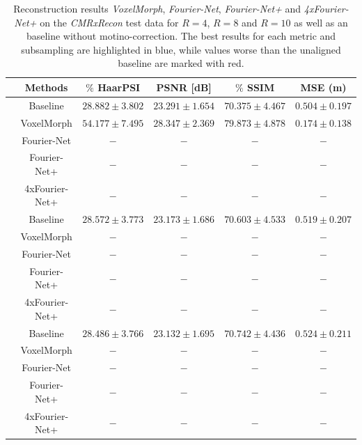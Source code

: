 \begin{table}[h] %
	\footnotesize
	\centering
	\caption{Reconstruction results \emph{VoxelMorph}, \emph{Fourier-Net}, \emph{Fourier-Net+} and \emph{4xFourier-Net+} on the \emph{CMRxRecon} test data for $R=4$, $R=8$ and $R=10$ as well as an baseline without motino-correction. The best results for each metric and subsampling are highlighted in blue, while values worse than the unaligned baseline are marked with red.}
	\label{tab:ComparisonReconstructionCMRxRecon}
	\begin{tabular}{c c c c c c} 
		\toprule
		 & Methods & $\%$ HaarPSI & PSNR [dB] & $\%$ SSIM & MSE (m)\\
		
		\midrule
		\multirow{5}{*}{\rotatebox{90}{$R=4$}} & Baseline & $28.882 \pm 3.802$ & $23.291 \pm 1.654$ & $70.375 \pm 4.467$ & $0.504 \pm 0.197$ \\  
		 & VoxelMorph & $54.177 \pm 7.495$ & $28.347 \pm 2.369$ & $79.873 \pm 4.878$ & $0.174 \pm 0.138$ \\ 
		 & Fourier-Net & $-$ & $-$ & $-$ & $-$ \\  
		 & Fourier-Net+ & $-$ & $-$ & $-$ & $-$ \\    
		 & 4xFourier-Net+ & $-$ & $-$ & $-$ & $-$ \\ 
		
		\midrule
		\multirow{5}{*}{\rotatebox{90}{$R=8$}} & Baseline & $28.572 \pm 3.773$ & $23.173 \pm 1.686$ & $70.603 \pm 4.533$ & $0.519 \pm 0.207$ \\  
		 & VoxelMorph & $-$ & $-$ & $-$ & $-$ \\ 
		 & Fourier-Net & $-$ & $-$ & $-$ & $-$ \\  
		 & Fourier-Net+ & $-$ & $-$ & $-$ & $-$ \\    
		 & 4xFourier-Net+ & $-$ & $-$ & $-$ & $-$ \\ 
		 	 
		\midrule		
		\multirow{5}{*}{\rotatebox{90}{$R=10$}} & Baseline & $28.486 \pm 3.766$ & $23.132 \pm 1.695$ & $70.742 \pm 4.436$ & $0.524 \pm 0.211$ \\  
		 & VoxelMorph & $-$ & $-$ & $-$ & $-$ \\ 
		 & Fourier-Net & $-$ & $-$ & $-$ & $-$ \\  
		 & Fourier-Net+ & $-$ & $-$ & $-$ & $-$ \\    
		 & 4xFourier-Net+ & $-$ & $-$ & $-$ & $-$ \\ 
		 \bottomrule
	\end{tabular}
\end{table}